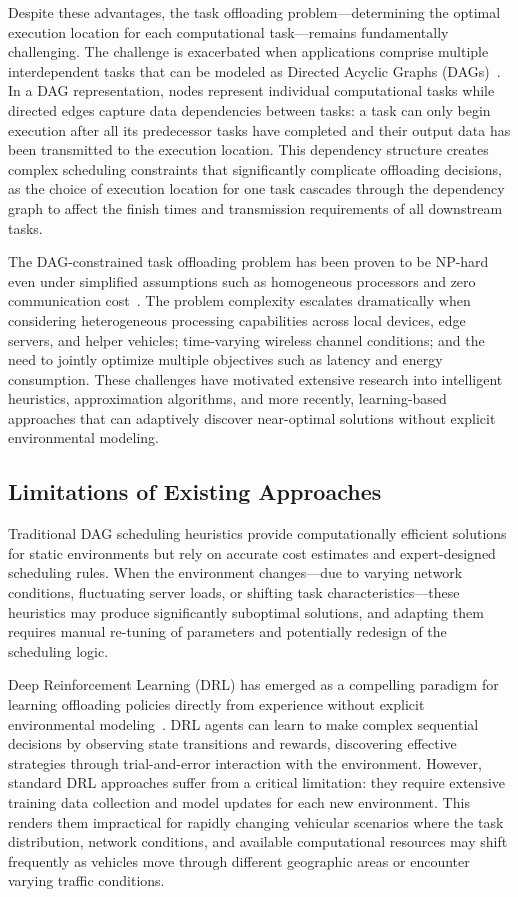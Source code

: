 \documentclass[journal,twoside]{IEEEtran}
\begin{document}
Despite these advantages, the task offloading problem---determining the optimal execution location for each computational task---remains fundamentally challenging. The challenge is exacerbated when applications comprise multiple interdependent tasks that can be modeled as Directed Acyclic Graphs (DAGs)~\cite{topcuoglu2002performance}. In a DAG representation, nodes represent individual computational tasks while directed edges capture data dependencies between tasks: a task can only begin execution after all its predecessor tasks have completed and their output data has been transmitted to the execution location. This dependency structure creates complex scheduling constraints that significantly complicate offloading decisions, as the choice of execution location for one task cascades through the dependency graph to affect the finish times and transmission requirements of all downstream tasks.

The DAG-constrained task offloading problem has been proven to be NP-hard even under simplified assumptions such as homogeneous processors and zero communication cost~\cite{arabnejad2014list}. The problem complexity escalates dramatically when considering heterogeneous processing capabilities across local devices, edge servers, and helper vehicles; time-varying wireless channel conditions; and the need to jointly optimize multiple objectives such as latency and energy consumption. These challenges have motivated extensive research into intelligent heuristics, approximation algorithms, and more recently, learning-based approaches that can adaptively discover near-optimal solutions without explicit environmental modeling.

\subsection{Limitations of Existing Approaches}

Traditional DAG scheduling heuristics provide computationally efficient solutions for static environments but rely on accurate cost estimates and expert-designed scheduling rules. When the environment changes---due to varying network conditions, fluctuating server loads, or shifting task characteristics---these heuristics may produce significantly suboptimal solutions, and adapting them requires manual re-tuning of parameters and potentially redesign of the scheduling logic.

Deep Reinforcement Learning (DRL) has emerged as a compelling paradigm for learning offloading policies directly from experience without explicit environmental modeling~\cite{chen2019optimized, hu2019dynamic, xu2019deep}. DRL agents can learn to make complex sequential decisions by observing state transitions and rewards, discovering effective strategies through trial-and-error interaction with the environment. However, standard DRL approaches suffer from a critical limitation: they require extensive training data collection and model updates for each new environment. This renders them impractical for rapidly changing vehicular scenarios where the task distribution, network conditions, and available computational resources may shift frequently as vehicles move through different geographic areas or encounter varying traffic conditions.
\end{document}
